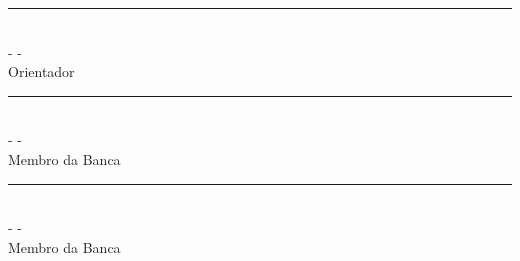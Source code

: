 \begin{folhadeaprovacao}
\begin{center}
				\vspace*{1 cm}%
				\rule{9 cm}{.1 mm}\\
				{\imprimirtitulacaoorientador}{ }{\imprimirorientador} - {\imprimirinstOrientador} - {\imprimirdepartamentoorientador}\\
				Orientador\\
				
				\vspace*{1 cm}%
				\rule{9 cm}{.1 mm}\\
				\imprimirtitulacaoexamum{ }\imprimirnmexamum - \imprimirinstexamum - \imprimirdepartamentoexamum\\
				Membro da Banca
				
				\vspace*{1 cm}%
				\rule{9 cm}{.1 mm}\\				
								
				\imprimirtitulacaoexamdois{ }\imprimirnomeexamdois - \imprimirinstexamdois - \imprimirdepartamentoexamdois\\
				Membro da Banca
				\vspace*{1.3 cm}%
		    \end{center}%


\end{folhadeaprovacao}
\makeatother
